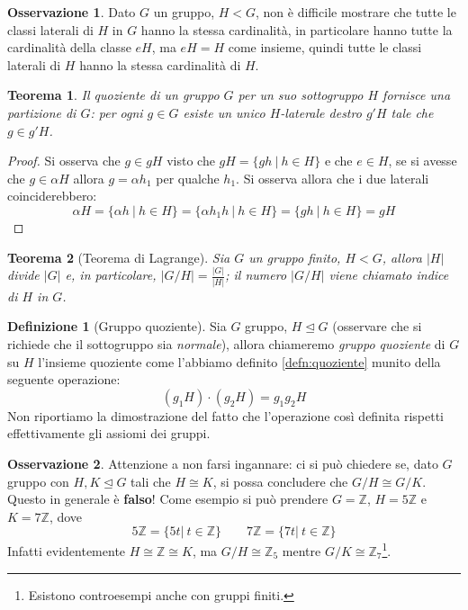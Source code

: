 \documentclass[11pt]{article}
\theoremstyle{plain}
\newtheorem{thm}{Teorema}[section]
\theoremstyle{definition}
\newtheorem{defn}{Definizione}[section]
\newtheorem*{rem}{Osservazione}
\theoremstyle{remark}
\newcommand{\Z}{\mathbb{Z}}
\begin{document}
\begin{rem}
	Dato $G$ un gruppo, $H<G$, non è difficile mostrare che tutte le classi laterali di $H$ in $G$ hanno la stessa cardinalità, in particolare hanno tutte la cardinalità della classe $eH$, ma $eH=H$ come insieme, quindi tutte le classi laterali di $H$ hanno la stessa cardinalità di $H$.
\end{rem}


\begin{thm}
	Il quoziente di un gruppo $G$ per un suo sottogruppo $H$ fornisce una partizione di $G$: per ogni $g\in G$ esiste un unico $H$-laterale destro $g'H$ tale che $g\in g'H$. 
\end{thm}
\begin{proof}
	Si osserva che $g\in gH$ visto che $gH=\{gh\ |\ h\in H\}$ e che $e\in H$, se si avesse che $g\in \alpha H$ allora $g=\alpha h_1$ per qualche $h_1$. Si osserva allora che i due laterali coinciderebbero:
	\[
		\alpha H=\{ \alpha h\ |\ h\in H\} = \{ \alpha h_1 h\ |\ h\in H \} = \{ gh\ |\ h\in H\} = gH
	\]
\end{proof}

\begin{thm}[Teorema di Lagrange]
	Sia $G$ un gruppo finito, $H<G$, allora $|H|$ divide $|G|$ e, in particolare, $\displaystyle |G/H|=\frac{|G|}{|H|}$; il numero $|G/H|$ viene chiamato \textit{indice} di $H$ in $G$.
\end{thm}


\begin{defn}[Gruppo quoziente]
	Sia $G$ gruppo, $H\trianglelefteq G$ (osservare che si richiede che il sottogruppo sia \textit{normale}), allora chiameremo \textit{gruppo quoziente} di $G$ su $H$ l'insieme quoziente come l'abbiamo definito \eqref{defn:quoziente} munito della seguente operazione:
	\[
		(g_1H)\cdot(g_2H)=g_1g_2H
	\]
	Non riportiamo la dimostrazione del fatto che l'operazione così definita rispetti effettivamente gli assiomi dei gruppi.
\end{defn}

\begin{rem}
	Attenzione a non farsi ingannare: ci si può chiedere se, dato $G$ gruppo con $H,K\trianglelefteq G$ tali che $H\cong K$, si possa concludere che $G/H\cong G/K$. Questo in generale è \textbf{falso}! Come esempio si può prendere $G=\Z$, $H=5\Z$ e $K=7\Z$, dove
	\[
		5\Z=\{ 5t|\ t\in \Z\}\qquad 7\Z=\{ 7t|\ t\in \Z\}
	\]
	Infatti evidentemente $H\cong \Z\cong K$, ma $G/H\cong \Z_5$ mentre $G/K\cong \Z_7$\footnote{Esistono controesempi anche con gruppi finiti.}.
\end{rem}
\end{document}
